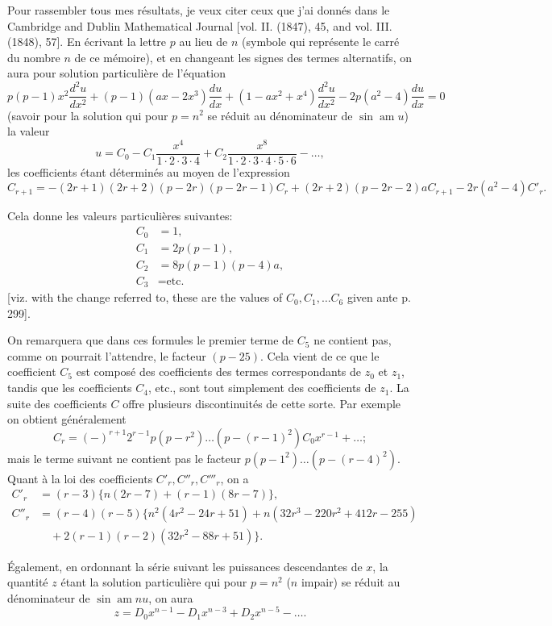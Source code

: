 \documentclass[12pt,a4paper]{article}
\theoremstyle{definition}
\begin{document}
Pour rassembler tous mes r\'{e}sultats, je veux citer ceux que j'ai donn\'{e}s dans le Cambridge and Dublin Mathematical Journal [vol. II. (1847), 45, and vol. III. (1848), 57]. En \'{e}crivant la lettre $p$ au lieu de $n$ (symbole qui repr\'{e}sente le carr\'{e} du nombre $n$ de ce m\'{e}moire), et en changeant les signes des termes alternatifs, on aura pour solution particuli\`{e}re de l'\'{e}quation
\[
p(p-1)x^2 \frac{d^2 u}{dx^2} + (p-1)(ax - 2x^3)\frac{du}{dx} + (1 - ax^2 + x^4)\frac{d^2 u}{dx^2} - 2p(a^2 - 4)\frac{du}{dx} = 0
\]
(savoir pour la solution qui pour $p = n^2$ se r\'{e}duit au d\'{e}nominateur de $\sin \operatorname{am} u$) la valeur
\[
u = C_0 - C_1 \frac{x^4}{1 \cdot 2 \cdot 3 \cdot 4} + C_2 \frac{x^8}{1 \cdot 2 \cdot 3 \cdot 4 \cdot 5 \cdot 6} - \ldots,
\]
les coefficients \'{e}tant d\'{e}termin\'{e}s au moyen de l'expression
\[
C_{r+1} = -(2r+1)(2r+2)(p-2r)(p-2r-1)C_r + (2r+2)(p-2r-2)aC_{r+1} - 2r(a^2-4)C'_r.
\]

Cela donne les valeurs particuli\`{e}res suivantes:
\begin{align*}
C_0 &= 1, \\
C_1 &= 2p(p-1), \\
C_2 &= 8p(p-1)(p-4)a, \\
C_3 &= \text{etc.}
\end{align*}
[viz. with the change referred to, these are the values of $C_0, C_1, \ldots C_6$ given ante p. 299].

On remarquera que dans ces formules le premier terme de $C_5$ ne contient pas, comme on pourrait l'attendre, le facteur $(p-25)$. Cela vient de ce que le coefficient $C_5$ est compos\'{e} des coefficients des termes correspondants de $z_0$ et $z_1$, tandis que les coefficients $C_4$, etc., sont tout simplement des coefficients de $z_1$. La suite des coefficients $C$ offre plusieurs discontinuit\'{e}s de cette sorte. Par exemple on obtient g\'{e}n\'{e}ralement
\[
C_r = (-)^{r+1} 2^{r-1} p(p-r^2) \ldots (p-(r-1)^2) C_0 x^{r-1} + \ldots;
\]
mais le terme suivant ne contient pas le facteur $p(p-1^2) \ldots (p-(r-4)^2)$. Quant \`{a} la loi des coefficients $C'_r, C''_r, C'''_r$, on a
\begin{align*}
C'_r &= (r-3)\{n(2r-7) + (r-1)(8r-7)\}, \\
C''_r &= (r-4)(r-5)\{n^2(4r^2 - 24r + 51) + n(32r^3 - 220r^2 + 412r - 255) \\
&\quad + 2(r-1)(r-2)(32r^2 - 88r + 51)\}.
\end{align*}

\'{E}galement, en ordonnant la s\'{e}rie suivant les puissances descendantes de $x$, la quantit\'{e} $z$ \'{e}tant la solution particuli\`{e}re qui pour $p = n^2$ ($n$ impair) se r\'{e}duit au d\'{e}nominateur de $\sin \operatorname{am} nu$, on aura
\[
z = D_0 x^{n-1} - D_1 x^{n-3} + D_2 x^{n-5} - \ldots.
\]
\end{document}
